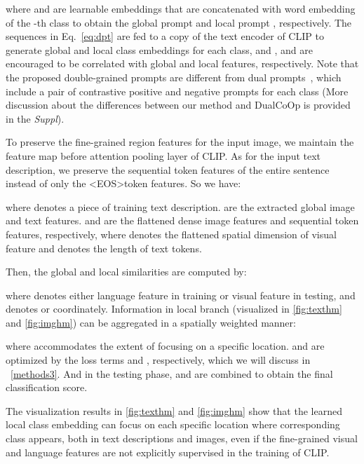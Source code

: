 \documentclass[10pt,twocolumn,letterpaper]{article}
\begin{document}
\noindent where  and  are learnable embeddings that are concatenated with word embedding  of the -th class to obtain the global prompt  and local prompt , respectively.
The sequences in Eq.~\eqref{eq:dpt} are fed to a copy of the text encoder  of CLIP to generate global and local class embeddings for each class, \ie  and ,
 and  are encouraged to be correlated with global and local features, respectively. Note that the proposed double-grained prompts are different from dual prompts~\cite{dualcoop}, which include a pair of contrastive positive and negative prompts for each class (More discussion about the differences between our method and DualCoOp is provided in the \emph{Suppl}).


To preserve the fine-grained region features for the input image, we maintain the feature map before attention pooling layer of CLIP.
As for the input text description, we preserve the sequential token features of the entire sentence instead of only the \textless EOS\textgreater token features. 
So we have:




\noindent where  denotes a piece of training text description.
 are the extracted global image and text features.
 and  are the flattened dense image features and sequential token features, respectively, where  denotes the flattened spatial dimension of visual feature and  denotes the length of text tokens.

Then, the global and local similarities are computed by:

\noindent where  denotes either language feature  in training or visual feature  in testing, and  denotes  or  coordinately.
Information in local branch  (visualized in \cref{fig:texthm} and \cref{fig:imghm}) can be aggregated in a spatially weighted manner:

\noindent where  accommodates the extent of focusing on a specific location.
 and  are optimized by the loss terms  and , respectively, which we will discuss in ~\cref{methods3}. And in the testing phase,  and  are combined to obtain the final classification score.

The visualization results in \cref{fig:texthm} and \cref{fig:imghm} show that the learned local class embedding  can focus on each specific location where corresponding class appears, both in text descriptions and images, even if the fine-grained visual and language features are not explicitly supervised in the training of CLIP. 
\end{document}
